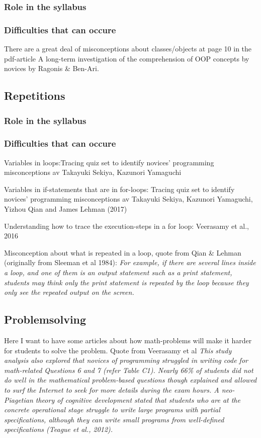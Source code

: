 \documentclass[twocolumn]{article}
\begin{document}
\subsubsection{Role in the syllabus}

\subsubsection{Difficulties that can occure}

There are a great deal of misconceptions about classes/objects at page 10 in the pdf-article A long-term investigation of the comprehension of OOP concepts by novices by Ragonis \& Ben-Ari.

\subsection{Repetitions}

\subsubsection{Role in the syllabus}

\subsubsection{Difficulties that can occure}

Variables in loops:Tracing quiz set to identify novices' programming misconceptions av Takayuki Sekiya, Kazunori Yamaguchi

Variables in if-statements that are in for-loops: Tracing quiz set to identify novices' programming misconceptions av Takayuki Sekiya, Kazunori Yamaguchi, Yizhou Qian and James Lehman (2017)

Understanding how to trace the execution-steps in a for loop: Veerasamy et al., 2016

Misconception about what is repeated in a loop, quote from Qian \& Lehman (originally from Sleeman et al 1984): \emph{ For example, if there are several lines inside a loop, and one of them is an output statement such as a print statement, students may think only the print statement is repeated by the loop because they only see the repeated output on the screen.}

\subsection{Problemsolving}

Here I want to have some articles about how math-problems will make it harder for students to solve the problem. Quote from Veerasamy et al \emph{This study analysis also explored that novices of programming struggled in writing code for math-related Questions 6 and 7 (refer Table C1). Nearly 66\% of students did not do well in the mathematical problem-based questions though explained and allowed to surf the Internet to seek for more details during the exam hours. A neo-Piagetian theory of cognitive development stated that students who are at the concrete operational stage struggle to write large programs with partial specifications, although they can write small programs from well-defined specifications (Teague et al., 2012).}
\end{document}
